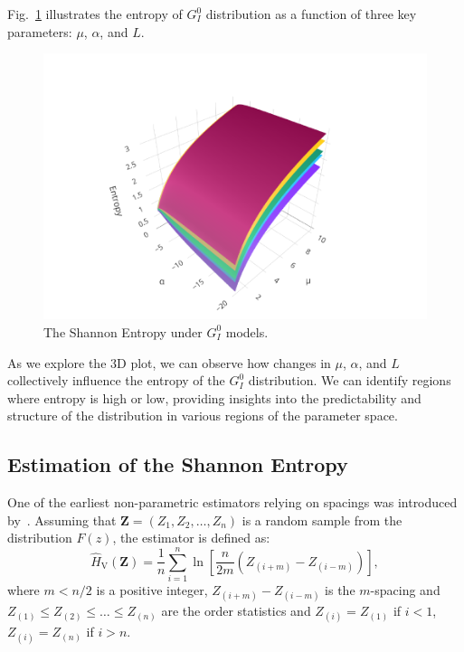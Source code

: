 \documentclass[conference,final,]{IEEEtran}
\begin{document}
Fig.~\ref{fig:3d_GIO} illustrates the entropy of \(G_I^0\) distribution
as a function of three key parameters: \(\mu\), \(\alpha\), and \(L\).

\begin{figure}[hbt]

{\centering \includegraphics[width=0.7\linewidth]{../../../Figures/PDF/entropy_plot_3d} 

}

\caption{The Shannon Entropy under ${G}_I^0$ models.}\label{fig:3d_GIO}
\end{figure}

As we explore the 3D plot, we can observe how changes in \(\mu\),
\(\alpha\), and \(L\) collectively influence the entropy of the
\(G_I^0\) distribution. We can identify regions where entropy is high or
low, providing insights into the predictability and structure of the
distribution in various regions of the parameter space.

\hypertarget{estimation-of-the-shannon-entropy}{%
\subsection{Estimation of the Shannon
Entropy}\label{estimation-of-the-shannon-entropy}}

One of the earliest non-parametric estimators relying on spacings was
introduced by~\cite{vasicek1976test}. Assuming that
\(\bm{Z}=(Z_1, Z_2,\ldots,Z_n)\) is a random sample from the
distribution \(F(z)\), the estimator is defined as: \begin{equation*}
\label{E:Vas}
    \widehat{H}_{\text{V}}(\bm{Z})=\frac{1}{n}\sum_{i=1}^{n}\ln\left[\frac{n}{2m}\left(Z_{(i+m)}-Z_{(i-m)}\right)\right],
    \end{equation*} where \(m<n/2\) is a positive integer,
\(Z_{(i+m)}-Z_{(i-m)}\) is the \(m\)-spacing and
\(Z_{(1)}\leq Z_{(2)}\leq\ldots\leq Z_{(n)}\) are the order statistics
and \(Z_{(i)}= Z_{(1)}\) if \(i<1\), \(Z_{(i)}= Z_{(n)}\) if \(i>n\).
\end{document}
